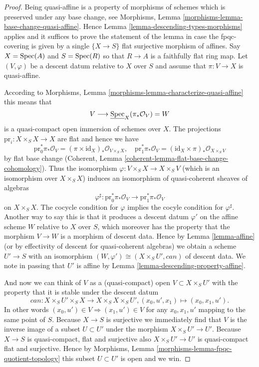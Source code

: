 \begin{proof}
Being quasi-affine is a property of morphisms of schemes
which is preserved under any base change, see
Morphisms, Lemma \ref{morphisms-lemma-base-change-quasi-affine}.
Hence Lemma \ref{lemma-descending-types-morphisms} applies
and it suffices to prove the statement of the lemma
in case the fpqc-covering is given by a single
$\{X \to S\}$ flat surjective morphism of affines.
Say $X = \mathop{\rm Spec}(A)$ and $S = \mathop{\rm Spec}(R)$ so
that $R \to A$ is a faithfully flat ring map.
Let $(V, \varphi)$ be a descent datum relative to $X$ over $S$
and assume that $\pi : V \to X$ is quasi-affine.

\medskip\noindent
According to Morphisms, Lemma \ref{morphisms-lemma-characterize-quasi-affine}
this means that
$$
V \longrightarrow \underline{\mathop{\rm Spec}}_X(\pi_*\mathcal{O}_V) = W
$$
is a quasi-compact open immersion of schemes over $X$.
The projections $\text{pr}_i : X \times_S X \to X$ are flat
and hence we have
$$
\text{pr}_0^*\pi_*\mathcal{O}_V =
(\pi \times \text{id}_X)_*\mathcal{O}_{V \times_S X}, \quad
\text{pr}_1^*\pi_*\mathcal{O}_V =
(\text{id}_X \times \pi)_*\mathcal{O}_{X \times_S V}
$$
by flat base change
(Coherent, Lemma \ref{coherent-lemma-flat-base-change-cohomology}).
Thus the isomorphism $\varphi : V \times_S X \to X \times_S V$ (which
is an isomorphism over $X\times_S X$) induces an isomorphism
of quasi-coherent sheaves of algebras
$$
\varphi^\sharp :
\text{pr}_0^*\pi_*\mathcal{O}_V
\longrightarrow
\text{pr}_1^*\pi_*\mathcal{O}_V
$$
on $X \times_S X$.
The cocycle condition for $\varphi$ implies the cocyle condition
for $\varphi^\sharp$. Another way to say this is that it produces
a descent datum $\varphi'$ on the affine scheme $W$ relative to
$X$ over $S$, which moreover has the property that the morphism
$V \to W$ is a morphism of descent data.
Hence by Lemma \ref{lemma-affine}
(or by effectivity of descent for quasi-coherent
algebras) we obtain a scheme $U' \to S$ with an isomorphism
$(W, \varphi') \cong (X \times_S U', can)$ of descent data.
We note in passing that $U'$ is affine by
Lemma \ref{lemma-descending-property-affine}.

\medskip\noindent
And now we can think of $V$ as a (quasi-compact)
open $V \subset X \times_S U'$ with the property that
it is stable under the descent datum
$$
can : X \times_S U' \times_S X \to X \times_S X \times_S U',
(x_0, u', x_1) \mapsto (x_0, x_1, u').
$$
In other words $(x_0, u') \in V \Rightarrow (x_1, u') \in V$
for any $x_0, x_1, u'$ mapping to the same point of $S$.
Because $X \to S$ is surjective we immediately find that
$V$ is the inverse image of a subset $U \subset U'$ under
the morphism $X \times_S U' \to U'$.
Because $X \to S$ is quasi-compact, flat and surjective
also $X \times_S U' \to U'$ is quasi-compact flat and surjective.
Hence by Morphisms, Lemma \ref{morphisms-lemma-fpqc-quotient-topology}
this subset $U \subset U'$ is open and we win.
\end{proof}












